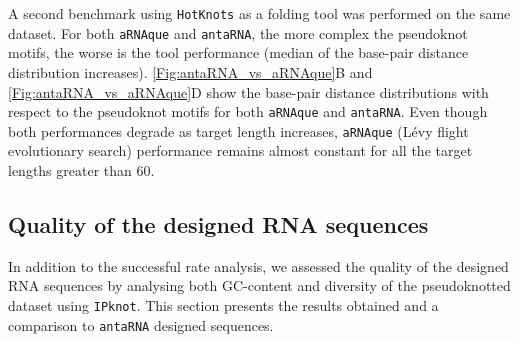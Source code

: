 A second benchmark using \texttt{HotKnots} as a folding tool was performed on the same dataset. For both \texttt{aRNAque} and \texttt{antaRNA}, the more complex the pseudoknot motifs, the worse is the tool performance (median of the base-pair distance distribution increases). \autoref{Fig:antaRNA_vs_aRNAque}B and \autoref{Fig:antaRNA_vs_aRNAque}D show the base-pair distance distributions with respect to the pseudoknot motifs for both \texttt{aRNAque} and \texttt{antaRNA}. Even though both performances degrade as target length increases, \texttt{aRNAque} (Lévy flight evolutionary search) performance remains almost constant for all the target lengths greater than $60$.
\subsection{Quality of the designed \ac{RNA} sequences}
In addition to the successful rate analysis, we assessed the quality of the designed \ac{RNA} sequences by analysing both GC-content and diversity of the pseudoknotted dataset using \texttt{IPknot}. This section presents the results obtained and a comparison to \texttt{antaRNA} designed sequences. 
